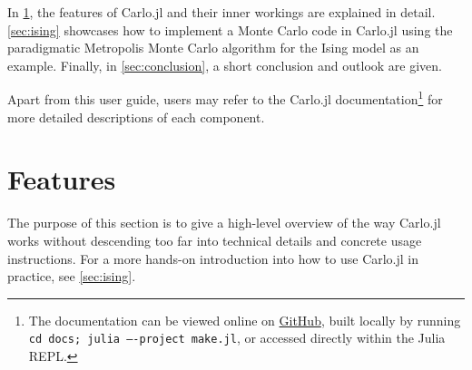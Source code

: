 \documentclass{SciPost}
\begin{document}
In \cref{sec:features}, the features of Carlo.jl and their inner workings are explained in detail. \cref{sec:ising} showcases how to implement a Monte Carlo code in Carlo.jl using the paradigmatic Metropolis Monte Carlo algorithm for the Ising model as an example. Finally, in \cref{sec:conclusion}, a short conclusion and outlook are given.

Apart from this user guide, users may refer to the Carlo.jl documentation\footnote{The documentation can be viewed online on \href{https://github.com/lukas-weber/Carlo.jl.git}{GitHub}, built locally by running  \texttt{cd docs; julia ----project make.jl}, or accessed directly within the Julia REPL.} for more detailed descriptions of each component.

\section{Features}
\label{sec:features}
The purpose of this section is to give a high-level overview of the way Carlo.jl works without descending too far into technical details and concrete usage instructions. For a more hands-on introduction into how to use Carlo.jl in practice, see \cref{sec:ising}.
\end{document}
